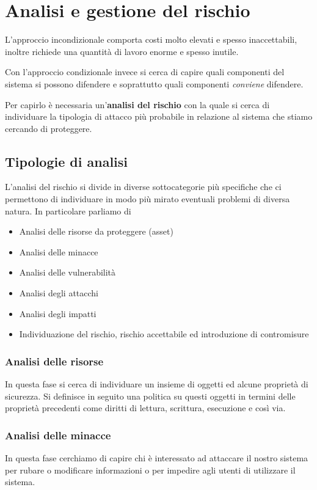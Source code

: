 \chapter{Analisi e gestione del rischio}
L'approccio incondizionale comporta costi molto elevati e spesso inaccettabili, inoltre richiede una quantità di lavoro
enorme e spesso inutile.

Con l'approccio condizionale invece si cerca di capire quali componenti del sistema si possono difendere e soprattutto
quali componenti \emph{conviene} difendere.

Per capirlo è necessaria un'\textbf{analisi del rischio} con la quale si cerca di individuare la tipologia di attacco
più probabile in relazione al sistema che stiamo cercando di proteggere.

\section{Tipologie di analisi}
L'analisi del rischio si divide in diverse sottocategorie più specifiche che ci permettono di individuare in modo più
mirato eventuali problemi di diversa natura. In particolare parliamo di
\begin{itemize}
	\item Analisi delle risorse da proteggere (asset)
	\item Analisi delle minacce
	\item Analisi delle vulnerabilità
	\item Analisi degli attacchi
	\item Analisi degli impatti
	\item Individuazione del rischio, rischio accettabile ed introduzione di contromisure
\end{itemize}

\subsection{Analisi delle risorse}
In questa fase si cerca di individuare un insieme di oggetti ed alcune proprietà di sicurezza. Si definisce in seguito
una politica su questi oggetti in termini delle proprietà precedenti come diritti di lettura, scrittura, esecuzione
e così via.

\subsection{Analisi delle minacce}
In questa fase cerchiamo di capire chi è interessato ad attaccare il nostro sistema per rubare o modificare informazioni
o per impedire agli utenti di utilizzare il sistema.

